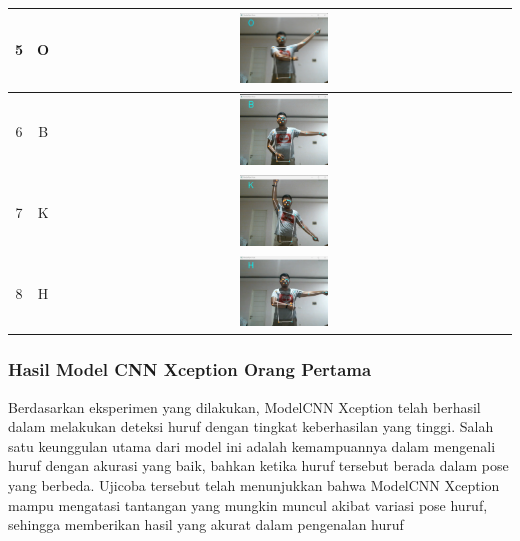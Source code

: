 \begin{table}[h]
\begin{tabular}{|c|c|c|}
		\hline
		5 & O & \includegraphics[width=0.2\textwidth]{gambar/bener/HurufO_ModelCNNResNet50V2_Dawe.png} \\
		\hline
		6 & B & \includegraphics[width=0.2\textwidth]{gambar/bener/HurufB_ModelCNNResNet50V2_Dawe.png} \\
		\hline
		7 & K & \includegraphics[width=0.2\textwidth]{gambar/bener/HurufK_ModelCNNResNet50V2_Dawe.png} \\
		\hline
		8 & H & \includegraphics[width=0.2\textwidth]{gambar/bener/HurufH_ModelCNNResNet50V2_Dawe.png} \\
		\hline
		\end{tabular}
		\end{table}


\subsubsection*{Hasil Model CNN Xception Orang Pertama}
Berdasarkan eksperimen yang dilakukan, ModelCNN Xception telah berhasil dalam melakukan deteksi huruf dengan tingkat keberhasilan yang tinggi. Salah satu keunggulan utama dari model ini adalah kemampuannya dalam mengenali huruf dengan akurasi yang baik, bahkan ketika huruf tersebut berada dalam pose yang berbeda. Ujicoba tersebut telah menunjukkan bahwa ModelCNN Xception mampu mengatasi tantangan yang mungkin muncul akibat variasi pose huruf, sehingga memberikan hasil yang akurat dalam pengenalan huruf

